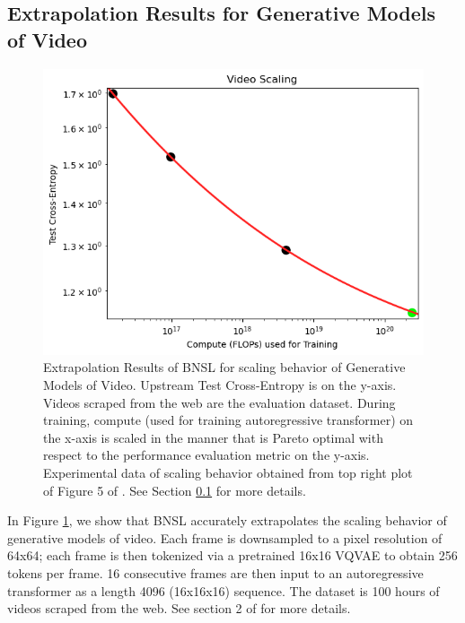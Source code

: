 \documentclass{article} %
\begin{document}
\FloatBarrier

\clearpage

\subsection{Extrapolation Results for Generative Models of Video}
\label{section:video}

\begin{figure}[htbp]
    \centering
\includegraphics[width=1.0\textwidth]{figures/video/video__compute.png}

    \caption{
Extrapolation Results of BNSL for scaling behavior of Generative Models of Video. Upstream Test Cross-Entropy is on the y-axis. Videos scraped from the web are the evaluation dataset. During training, compute (used for training autoregressive transformer) on the x-axis is scaled in the manner that is Pareto optimal with respect to the performance evaluation metric on the y-axis. Experimental data of scaling behavior obtained from top right plot of Figure 5 of \cite{2020arXiv201014701H}. See Section \ref{section:video} for more details.
    }
    \label{fig:video_compute_scaling}
\end{figure}

In Figure \ref{fig:video_compute_scaling}, we show that BNSL accurately extrapolates the scaling behavior of generative models of video. Each frame is downsampled to a pixel resolution of 64x64; each frame is then tokenized via a pretrained 16x16 VQVAE \citep{van2017neural} to obtain 256 tokens per frame. 16 consecutive frames are then input to an autoregressive transformer as a length 4096 (16x16x16) sequence. The dataset is 100 hours of videos scraped from the web. See section 2 of \cite{2020arXiv201014701H} for more details.
\end{document}
